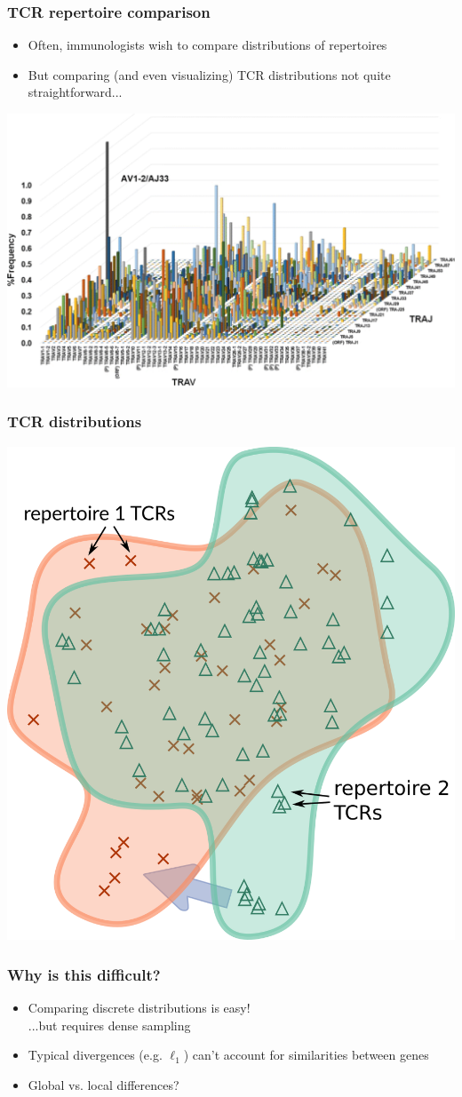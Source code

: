 \documentclass[mathserif,compress,xcolor={dvipsnames}]{beamer}
\renewcommand\;{\,}
\begin{document}
\begin{frame}\frametitle{TCR repertoire comparison}
\begin{itemize}
\bigskip
\item
Often, immunologists wish to compare distributions of repertoires
\bigskip
\item
But comparing (and even visualizing) TCR distributions not quite straightforward...
\end{itemize}
\begin{center}
\includegraphics[width=0.8\linewidth]{Images/TCRRepertoire.png}
\end{center}
\end{frame}

\begin{frame}\frametitle{TCR distributions}
\begin{center}
\includegraphics[width=0.6\linewidth]{Images/transport-cartoon.png}
\end{center}
\end{frame}

\begin{frame}\frametitle{Why is this difficult?}
\begin{itemize}
\item
Comparing discrete distributions is easy! \\ ...but requires dense sampling
\bigskip
\item
Typical divergences (e.g. $\ell_1$) can't account for similarities between genes
\bigskip
\item
Global vs. local differences?
\end{itemize}
\end{frame}
\end{document}
